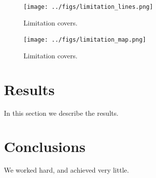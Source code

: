 \documentclass[12pt]{article}
\begin{document}
\begin{figure}[!ht]
  \centering
    \texttt{[image: ../figs/limitation\_lines.png]}

  \caption{Limitation covers.}
\end{figure}

\begin{figure}[!ht]
  \centering
    \texttt{[image: ../figs/limitation\_map.png]}

  \caption{Limitation covers.}
\end{figure}

\section{Results}\label{results}
In this section we describe the results.

\section{Conclusions}\label{conclusions}
We worked hard, and achieved very little.



\end{document}
